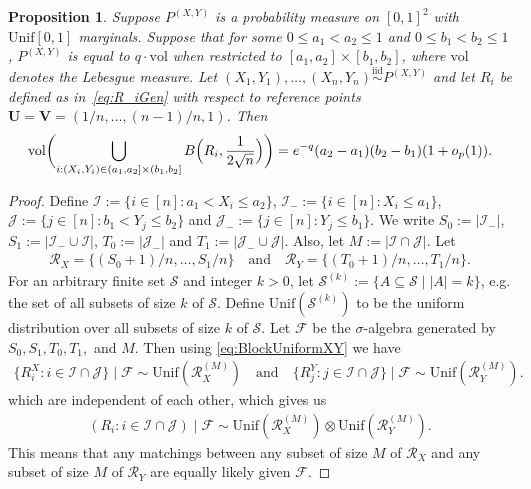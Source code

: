 \documentclass[11pt]{article}
\newtheorem{prop}[thm]{Proposition}
\newcommand{\vol}{\mathrm{vol}}
\newcommand{\abs}[1]{| #1|}
\newcommand{\iid}{\stackrel{\mathrm{iid}}\sim}
\begin{document}
\begin{prop}
\label{Prop:PiecewiseConstantFixed}
Suppose $P^{(X,Y)}$ is a probability measure on $[0,1]^2$ with $\mathrm{Unif}[0,1]$ marginals. Suppose that for some $0\leq a_1 < a_2\leq 1$ and $0\leq b_1 < b_2\leq 1$, $P^{(X,Y)}$ is equal to $q \cdot \mathrm{vol}$ when restricted to $[a_1,a_2]\times [b_1,b_2]$, where $\mathrm{vol}$ denotes the Lebesgue measure. Let $(X_1,Y_1),\ldots,(X_n,Y_n)\iid P^{(X,Y)}$ and let $R_i$ be defined as in~\eqref{eq:R_iGen} with respect to reference points $\boldsymbol{U} = \boldsymbol{V} = (1/n, \ldots, (n-1)/n, 1)$. Then
\[
   \vol\biggl( \bigcup_{i: (X_i,Y_i)\in(a_1,a_2]\times (b_1,b_2]} B\Bigl(R_i, \frac{1}{2\sqrt{n}}\Bigr)\biggr) = e^{-q}(a_2-a_1)(b_2-b_1)(1+o_p(1)).
\]
\end{prop}
\begin{proof}
Define $\mathcal{I} := \{i\in[n]: a_1 < X_i \leq a_2\}$, $\mathcal{I}_{-}:=\{i\in[n]:X_i \leq a_1\}$, $\mathcal{J} := \{j\in[n]: b_1 < Y_j\leq b_2\}$ and $\mathcal{J}_-:=\{j\in[n]:Y_j\leq b_1\}$. We write $S_0:= |\mathcal{I}_-|$, $S_1:=|\mathcal{I}_-\cup \mathcal{I}|$, $T_0:=|\mathcal{J}_-|$ and $T_1:=|\mathcal{J}_-\cup\mathcal{J}|$. Also, let $M := |\mathcal{I}\cap \mathcal{J}|$. Let 
\begin{align*}
    \mathcal{R}_X= \{(S_{0} + 1)/n, \ldots, S_1/n\} \quad \text{and} \quad  \mathcal{R}_Y= \{(T_{0} + 1)/n, \ldots, T_1/n \}.
\end{align*}  
For an arbitrary finite set $\mathcal{S}$ and integer $k > 0$, let $\mathcal{S}^{(k)}:=\{A\subseteq\mathcal{S}\mid \abs{A} = k\}$, e.g. the set of all subsets of size $k$ of $\mathcal{S}$. Define $\mathrm{Unif}(\mathcal{S}^{(k)})$ to be the uniform distribution over all subsets of size $k$ of $\mathcal{S}$. Let $\mathcal{F}$ be the $\sigma$-algebra generated by $S_0, S_1, T_0, T_1,$ and $M$. Then using \eqref{eq:BlockUniformXY} we have
\begin{align*}
\{R^X_i:i\in\mathcal{I} \cap \mathcal{J}\}\mid \mathcal{F} \sim \mathrm{Unif}(\mathcal{R}_X^{(M)}) \quad \text{and}\quad \{R^Y_j:j\in\mathcal{I} \cap \mathcal{J}\} \mid \mathcal{F}\sim \mathrm{Unif}(\mathcal{R}_Y^{(M)}).
\end{align*}
which are independent of each other, which gives us
\begin{align*}
    (R_i: i\in\mathcal{I}\cap\mathcal{J})\mid \mathcal{F}\sim \mathrm{Unif}(\mathcal{R}_X^{(M)})\otimes \mathrm{Unif}(\mathcal{R}_Y^{(M)}).
\end{align*}
This means that any matchings between any subset of size $M$ of $\mathcal{R}_X$ and any subset of size $M$ of $\mathcal{R}_Y$ are equally likely given $\mathcal{F}$.


\end{proof}
\end{document}
